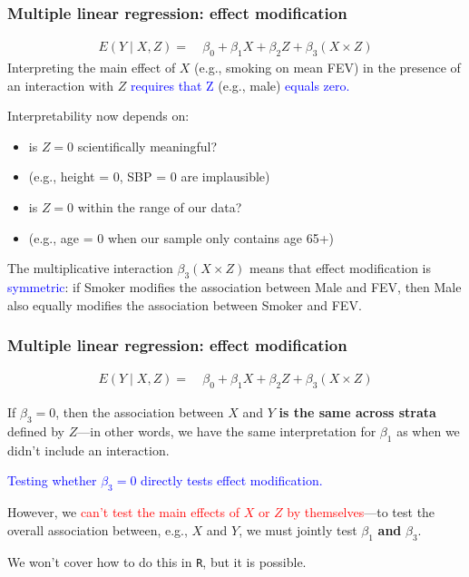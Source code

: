 \documentclass[12pt, 
hyperref={colorlinks=true, linkcolor=blue, urlcolor=cyan},dvipsnames]{beamer}
\begin{document}
\begin{frame}
\frametitle{Multiple linear regression: effect modification}
\vspace{-0.4cm}
\begin{align*}
E(Y \mid X, Z) =& \ \beta_0 + \beta_1 X + \beta_2 Z + \beta_3 (X \times Z)
\end{align*}
Interpreting the main effect of $X$ (e.g., smoking on mean FEV) in the presence of an interaction with $Z$ \textcolor{blue}{requires that Z} (e.g., male) \textcolor{blue}{equals zero.}

Interpretability now depends on: \vspace{-0.2cm}
\begin{itemize}
\item is $Z = 0$ scientifically meaningful? 
\item[] {\small (e.g., height = 0, SBP = 0 are implausible)}
\item is $Z = 0$ within the range of our data? 
\item[] {\small (e.g., age = 0 when our sample only contains age 65+)}
\end{itemize}

The multiplicative interaction $\beta_3 (X \times Z)$ means that effect modification is \textcolor{blue}{symmetric}: if Smoker modifies the association between Male and FEV, then Male also equally modifies the association between Smoker and FEV.
\end{frame}

\begin{frame}
\frametitle{Multiple linear regression: effect modification}
\begin{align*}
E(Y \mid X, Z) =& \ \beta_0 + \beta_1 X + \beta_2 Z + \beta_3 (X \times Z)
\end{align*}

If $\beta_3 = 0$, then the association between $X$ and $Y$ \textbf{is the same across strata} defined by $Z$---in other words, we have the same interpretation for $\beta_1$ as when we didn't include an interaction.

\textcolor{blue}{Testing whether $\beta_3 = 0$ directly tests effect modification.}

However, we \textcolor{red}{can't test the main effects of $X$ or $Z$ by themselves}---to test the overall association between, e.g., $X$ and $Y$, we must jointly test $\beta_1$ \textbf{and} $\beta_3$.

We won't cover how to do this in \texttt{R}, but it is possible.
\end{frame}
\end{document}
